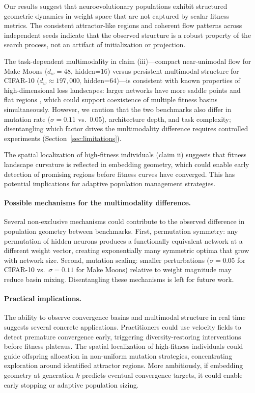 \documentclass{article}
\begin{document}
Our results suggest that neuroevolutionary populations exhibit
structured geometric dynamics in weight space that are not captured by
scalar fitness metrics. The consistent attractor-like regions and
coherent flow patterns across independent seeds indicate that
the observed structure is a robust property of the search process,
not an artifact of initialization or projection.

The task-dependent multimodality in claim (iii)---compact near-unimodal
flow for Make Moons ($d_w = 48$, hidden=16) versus persistent multimodal
structure for CIFAR-10 ($d_w \approx 197{,}000$, hidden=64)---is
consistent with known properties of high-dimensional loss landscapes:
larger networks have more saddle points and flat regions
\cite{dauphin2014identifying}, which could support coexistence of
multiple fitness basins simultaneously. However, we caution that the two
benchmarks also differ in mutation rate ($\sigma = 0.11$ vs.\ $0.05$),
architecture depth, and task complexity; disentangling which factor
drives the multimodality difference requires controlled experiments
(Section~\ref{sec:limitations}).

The spatial localization of high-fitness individuals (claim ii)
suggests that fitness landscape curvature is reflected in embedding
geometry, which could enable early detection of promising regions
before fitness curves have converged. This has potential implications
for adaptive population management strategies.

\paragraph{Possible mechanisms for the multimodality difference.}
Several non-exclusive mechanisms could contribute to the observed
difference in population geometry between benchmarks. First, permutation
symmetry: any permutation of hidden neurons produces a functionally
equivalent network at a different weight vector, creating exponentially
many symmetric optima that grow with network size. Second, mutation
scaling: smaller perturbations ($\sigma=0.05$ for CIFAR-10 vs.\
$\sigma=0.11$ for Make Moons) relative to weight magnitude may reduce
basin mixing. Disentangling these mechanisms is left for future work.

\paragraph{Practical implications.}
The ability to observe convergence basins and multimodal structure
in real time suggests several concrete applications. Practitioners
could use velocity fields to detect premature convergence early,
triggering diversity-restoring interventions before fitness plateaus.
The spatial localization of high-fitness individuals could guide
offspring allocation in non-uniform mutation strategies, concentrating
exploration around identified attractor regions. More ambitiously,
if embedding geometry at generation $k$ predicts eventual convergence
targets, it could enable early stopping or adaptive population sizing.
\end{document}
